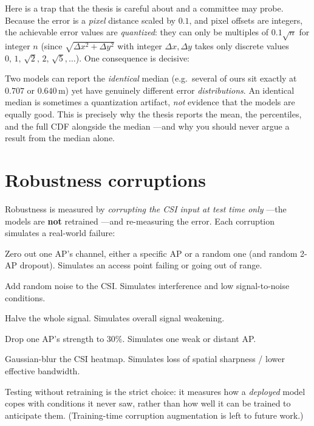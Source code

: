 Here is a trap that the thesis is careful about and a committee may probe. Because the error is a
\emph{pixel} distance scaled by $0.1$, and pixel offsets are integers, the achievable error values are
\emph{quantized}: they can only be multiples of $0.1\sqrt{n}$ for integer $n$ (since
$\sqrt{\Delta x^2 + \Delta y^2}$ with integer $\Delta x,\Delta y$ takes only discrete values
$0,\,1,\,\sqrt2,\,2,\,\sqrt5,\dots$). One consequence is decisive:

\begin{keyidea}
Two models can report the \emph{identical} median (e.g.\ several of ours sit exactly at $0.707$ or
$0.640$\,m) yet have genuinely different error \emph{distributions}. An identical median is sometimes
a quantization artifact, \emph{not} evidence that the models are equally good. This is precisely why
the thesis reports the mean, the percentiles, and the full CDF alongside the median ---and why you
should never argue a result from the median alone.
\end{keyidea}

\section{Robustness corruptions}
\label{sec:eval:corruptions}

Robustness is measured by \emph{corrupting the CSI input at test time only} ---the models are
\textbf{not} retrained ---and re-measuring the error. Each corruption simulates a real-world failure:
\begin{description}[leftmargin=2.0cm,style=nextline,nosep]
  \item[AP dropout] Zero out one AP's channel, either a specific AP or a random one (and random
  2-AP dropout). Simulates an access point failing or going out of range.
  \item[Gaussian noise $\sigma\in\{0.1,0.2\}$] Add random noise to the CSI. Simulates interference and
  low signal-to-noise conditions.
  \item[Global attenuation $0.5\times$] Halve the whole signal. Simulates overall signal weakening.
  \item[Single-AP attenuation $0.3\times$] Drop one AP's strength to $30\%$. Simulates one weak or
  distant AP.
  \item[Blur ($5\times5$, $\sigma{=}1$)] Gaussian-blur the CSI heatmap. Simulates loss of spatial
  sharpness / lower effective bandwidth.
\end{description}
Testing without retraining is the strict choice: it measures how a \emph{deployed} model copes with
conditions it never saw, rather than how well it can be trained to anticipate them. (Training-time
corruption augmentation is left to future work.)

